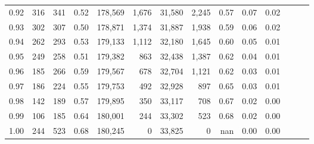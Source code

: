 \begin{tabular}{rrrrrrrrrrrrrr}
0.92 &    316 &  341 &  0.52 &  178,569 &    1,676 &  31,580 &   2,245 &  0.57 &  0.07 &      0.02 \\
0.93 &    302 &  307 &  0.50 &  178,871 &    1,374 &  31,887 &   1,938 &  0.59 &  0.06 &      0.02 \\
0.94 &    262 &  293 &  0.53 &  179,133 &    1,112 &  32,180 &   1,645 &  0.60 &  0.05 &      0.01 \\
0.95 &    249 &  258 &  0.51 &  179,382 &      863 &  32,438 &   1,387 &  0.62 &  0.04 &      0.01 \\
0.96 &    185 &  266 &  0.59 &  179,567 &      678 &  32,704 &   1,121 &  0.62 &  0.03 &      0.01 \\
0.97 &    186 &  224 &  0.55 &  179,753 &      492 &  32,928 &     897 &  0.65 &  0.03 &      0.01 \\
0.98 &    142 &  189 &  0.57 &  179,895 &      350 &  33,117 &     708 &  0.67 &  0.02 &      0.00 \\
0.99 &    106 &  185 &  0.64 &  180,001 &      244 &  33,302 &     523 &  0.68 &  0.02 &      0.00 \\
1.00 &    244 &  523 &  0.68 &  180,245 &        0 &  33,825 &       0 &   nan &  0.00 &      0.00 \\
\bottomrule
\end{tabular}
